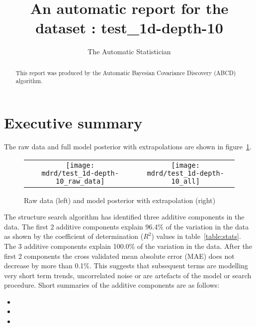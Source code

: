 \documentclass{article} %
\title{An automatic report for the dataset : test_1d-depth-10}
\author{
The Automatic Statistician
}
\begin{document}
\allowdisplaybreaks

\maketitle

\begin{abstract}
This report was produced by the Automatic Bayesian Covariance Discovery (ABCD) algorithm.
\end{abstract}

\section{Executive summary}

The raw data and full model posterior with extrapolations are shown in figure~\ref{fig:rawandfit}.

\begin{figure}[H]
\newcommand{\wmgd}{0.5\columnwidth}
\newcommand{\hmgd}{3.0cm}
\newcommand{\mdrd}{test_1d-depth-10}
\newcommand{\mbm}{\hspace{-0.3cm}}
\begin{tabular}{cc}
\mbm \texttt{[image: \\mdrd/test\_1d-depth-10\_raw\_data]} & \texttt{[image: \\mdrd/test\_1d-depth-10\_all]}
\end{tabular}
\caption{Raw data (left) and model posterior with extrapolation (right)}
\label{fig:rawandfit}
\end{figure}

The structure search algorithm has identified three additive components in the data.
The  first 2 additive components explain 96.4\% of the variation in the data as shown by the coefficient of determination ($R^2$) values in table~\ref{table:stats}.
The 3 additive components explain 100.0\% of the variation in the data.
After the first 2 components the cross validated mean absolute error (MAE) does not decrease by more than 0.1\%.
This suggests that subsequent terms are modelling very short term trends, uncorrelated noise or are artefacts of the model or search procedure.
Short summaries of the additive components are as follows:
\begin{itemize}

  \item  

  \item  

  \item  

\end{itemize}
\end{document}

